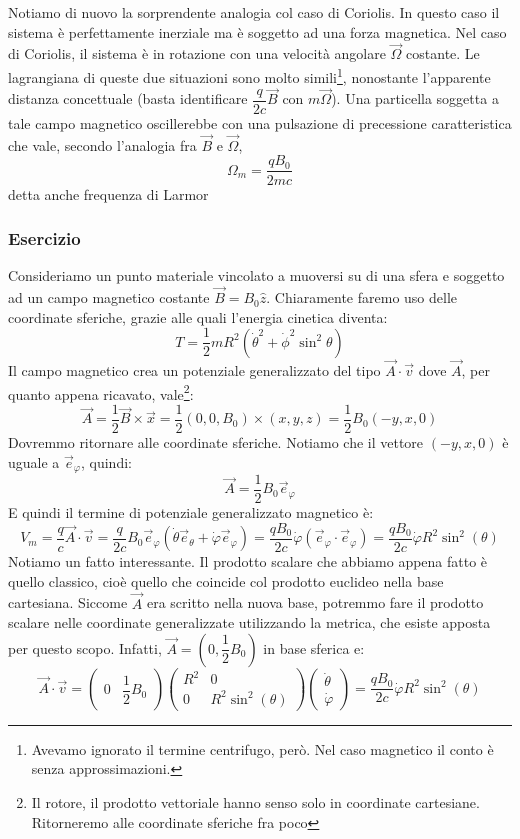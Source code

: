 \documentclass[a4paper,openany]{article}
\begin{document}
	Notiamo di nuovo la sorprendente analogia col caso di Coriolis. In questo caso il sistema è perfettamente inerziale ma è soggetto ad una forza magnetica. Nel caso di Coriolis, il sistema è in rotazione con una velocità angolare $\vec{\Omega}$ costante. Le lagrangiana di queste due situazioni sono molto simili\footnote{Avevamo ignorato il termine centrifugo, però. Nel caso magnetico il conto è senza approssimazioni.}, nonostante l'apparente distanza concettuale (basta identificare $\dfrac{q}{2c}\vec{B}$ con $m\vec{\Omega}$). Una particella soggetta a tale campo magnetico oscillerebbe con una pulsazione di precessione caratteristica che vale, secondo l'analogia fra $\vec{B}$ e $\vec{\Omega}$,
	$$
	\Omega_m = \dfrac{qB_0}{2mc}
	$$
	detta anche frequenza di Larmor
	\subsubsection{Esercizio}
	Consideriamo un punto materiale vincolato a muoversi su di una sfera e soggetto ad un campo magnetico costante $\vec{B} = B_0 \hat{z}$. Chiaramente faremo uso delle coordinate sferiche, grazie alle quali l'energia cinetica diventa:
	$$
	T = \dfrac{1}{2}mR^2(\dot{\theta}^2+\dot{\phi}^2\sin^2\theta)
	$$
	Il campo magnetico crea un potenziale generalizzato del tipo $\vec{A}\cdot\vec{v}$ dove $\vec{A}$, per quanto appena ricavato, vale\footnote{Il rotore, il prodotto vettoriale hanno senso solo in coordinate cartesiane. Ritorneremo alle coordinate sferiche fra poco}:
	$$
	\vec{A} = \dfrac{1}{2}\vec{B}\times\vec{x} = \dfrac{1}{2}(0,0,B_0)\times(x,y,z) =\dfrac{1}{2}B_0 (-y,x,0)
	$$
	Dovremmo ritornare alle coordinate sferiche. Notiamo che il vettore $(-y,x,0)$ è uguale a $\vec{e}_\varphi$, quindi:
	$$
	\vec{A} = \dfrac{1}{2}B_0\vec{e}_\varphi
	$$
	E quindi il termine di potenziale generalizzato magnetico è:
	$$
	V_m = \dfrac{q}{c}\vec{A}\cdot\vec{v} = \dfrac{q}{2c}B_0\vec{e}_\varphi(\dot{\theta}\vec{e}_\theta + \dot{\varphi}\vec{e}_\varphi) = \dfrac{qB_0}{2c}\dot{\varphi} (\vec{e}_\varphi\cdot\vec{e}_\varphi) = \dfrac{qB_0}{2c}\dot{\varphi}R^2\sin^2(\theta)
	$$
	Notiamo un fatto interessante. Il prodotto scalare che abbiamo appena fatto è quello classico, cioè quello che coincide col prodotto euclideo nella base cartesiana. Siccome $\vec{A}$ era scritto nella nuova base, potremmo fare il prodotto scalare nelle coordinate generalizzate utilizzando la metrica, che esiste apposta per questo scopo. Infatti, $\vec{A} = (0,\dfrac{1}{2}B_0)$ in base sferica e:
	\begin{equation}
		\vec{A}\cdot\vec{v} = 
		\begin{pmatrix}
			0 &
			\dfrac{1}{2}B_0
		\end{pmatrix}
		\begin{pmatrix}
			R^2 & 0 \\
			0 & R^2 \sin^2(\theta)
		\end{pmatrix}
		\begin{pmatrix}
			\dot{\theta} \\
			\dot{\varphi}
		\end{pmatrix}
		= \dfrac{qB_0}{2c}\dot{\varphi}R^2\sin^2(\theta)
	\end{equation}
\end{document}
